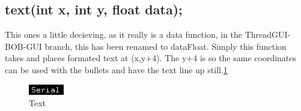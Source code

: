 \documentclass{article}
\begin{document}
\subsection{text(int x, int y, float data);}
This ones a little decieving, as it really is a data function, in the ThreadGUI-BOB-GUI branch, this has been renamed to dataFloat. Simply this function takes and places formated text at (x,y+4). The y+4 is so the same coordinates can be used with the bullets and have the text line up still.\ref{text}
\begin{figure}[htp]
  \begin{center}
\includegraphics[]{text}
  \end{center}
  \caption{Text}
\label{text}
\end{figure}\\
\end{document}
